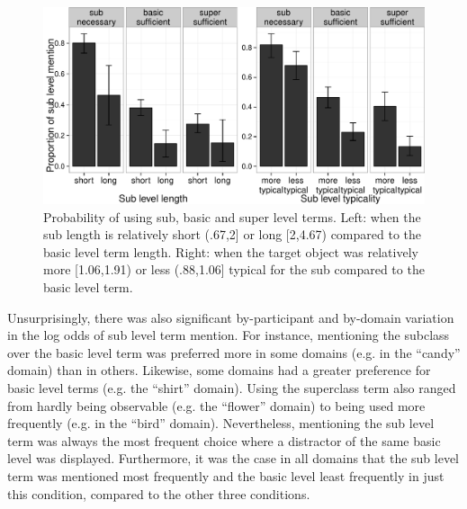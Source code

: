 \documentclass[10pt,letterpaper]{article}
\newcommand{\figref}[1]{Fig.~\ref{#1}}
\begin{document}
\begin{figure}[ht!]
\centering
\includegraphics[width=.5\textwidth]{graphs/length-typicality}
\caption{Probability of using sub, basic and super level terms. Left: when the sub  length is relatively short (.67,2] or long [2,4.67) compared to the basic level term length. Right: when the target object was relatively more [1.06,1.91) or less (.88,1.06] typical for the sub compared to the basic level term.}
 \label{fig:lengthtypicality}
\end{figure}




%


Unsurprisingly, there was also significant by-participant and by-domain variation in the log odds of sub level term mention. %
For instance, mentioning the subclass over the basic level term was preferred more in some domains (e.g. in the ``candy'' domain) than in others. Likewise, some domains had a greater preference for basic level terms (e.g. the ``shirt'' domain). Using the superclass term also ranged from hardly being observable (e.g. the ``flower'' domain) to being used more frequently (e.g. in the ``bird'' domain). Nevertheless, mentioning the sub level term was always the most frequent choice where a distractor of the same basic level was displayed. Furthermore, it was the case in all domains that the sub level term was mentioned most frequently and the basic level least frequently in just this condition, compared to the other three conditions.
\end{document}
